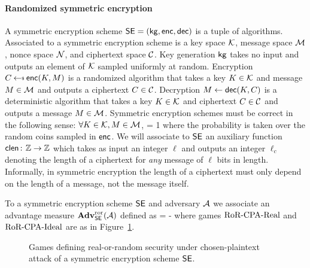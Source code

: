 \paragraph{Randomized symmetric encryption} A symmetric encryption scheme ${\mathsf{SE}} = ({\sf kg}, {\sf enc}, {\sf dec})$ 
is a tuple of algorithms. Associated to a symmetric encryption scheme is a key space ${\cal K}$, message space ${\cal M}$, nonce space ${\cal N}$, and ciphertext space ${\cal C}$.
Key generation ${\sf kg}$ takes no input and outputs an element of ${\cal K}$ sampled uniformly at random. Encryption $C\getsr\enc(K, M)$ is a randomized algorithm that takes a key $K\in{\cal K}$ and message $M\in{\cal M}$ and outputs a ciphertext $C\in{\cal C}$. Decryption $M\gets{\sf dec}(K, C)$ is a deterministic algorithm that takes a key $K\in{\cal K}$ and ciphertext $C\in{\cal C}$ and outputs a message $M\in{\cal M}$. Symmetric encryption schemes must be correct in the following sense: $\forall K\in{\cal K},M\in{\cal M}$,
\bnm
{} = 1
\enm
where the probability is taken over the random coins sampled in ${\sf enc}$. We will associate to ${\mathsf{SE}}$ an auxiliary function $\textsf{clen}{{\kern .05em}\colon{\kern .05em}}\mathbb{Z}\rightarrow\mathbb{Z}$ which takes as input an integer $\ell$ and outputs an integer $\ell_c$ denoting the length of a ciphertext for \emph{any} message of $\ell$ bits in length. Informally, in symmetric encryption the length of a ciphertext must only depend on the length of a message, not the message itself. 


To a symmetric encryption scheme ${\mathsf{SE}}$ and adversary ${\mathcal A}$ we associate an advantage measure $\mathbf{Adv}^{\mathrm{ror}}_{{\mathsf{SE}}}({\mathcal A})$ defined as 
\bnm
\AdvROR{\SE}{\advA} = \left\lvert {} - \right\rvert
\enm
where games $\text{RoR-CPA-Real}$ and $\text{RoR-CPA-Ideal}$ are as in Figure~\ref{fig:rorcpa}.

\begin{figure}[t]
\centering
{}
\caption{Games defining real-or-random security under chosen-plaintext attack of a symmetric encryption scheme ${\mathsf{SE}}$.}
\label{fig:rorcpa}
\end{figure}

